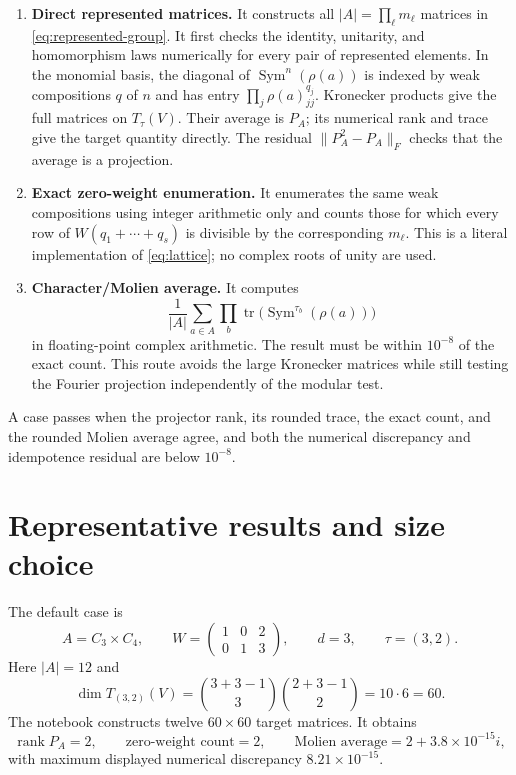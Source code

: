 \documentclass[11pt]{article}
\newcommand{\Sym}{\operatorname{Sym}}
\begin{document}
\begin{enumerate}[leftmargin=*,label=\textbf{\arabic*.}]
\item \textbf{Direct represented matrices.}
It constructs all $|A|=\prod_\ell m_\ell$ matrices in
\eqref{eq:represented-group}.  It first checks the identity, unitarity, and
homomorphism laws numerically for every pair of represented elements.  In the
monomial basis, the diagonal of
$\Sym^n(\rho(a))$ is indexed by weak compositions $q$ of $n$ and has entry
$\prod_j\rho(a)_{jj}^{q_j}$.  Kronecker products give the full matrices on
$T_\tau(V)$.  Their average is $P_A$; its numerical rank and trace give the
target quantity directly.  The residual $\lVert P_A^2-P_A\rVert_F$ checks
that the average is a projection.

\item \textbf{Exact zero-weight enumeration.}
It enumerates the same weak compositions using integer arithmetic only and
counts those for which every row of $W(q_1+\cdots+q_s)$ is divisible by the
corresponding $m_\ell$.  This is a literal implementation of
\eqref{eq:lattice}; no complex roots of unity are used.

\item \textbf{Character/Molien average.}
It computes
\[
 \frac1{|A|}\sum_{a\in A}
 \prod_b\operatorname{tr}\bigl(\Sym^{\tau_b}(\rho(a))\bigr)
\]
in floating-point complex arithmetic.  The result must be within $10^{-8}$ of
the exact count.  This route avoids the large Kronecker matrices while still
testing the Fourier projection independently of the modular test.
\end{enumerate}

A case passes when the projector rank, its rounded trace, the exact count, and
the rounded Molien average agree, and both the numerical discrepancy and
idempotence residual are below $10^{-8}$.

\section{Representative results and size choice}

The default case is
\[
 A=C_3\times C_4,\qquad
 W=\begin{pmatrix}1&0&2\\0&1&3\end{pmatrix},\qquad
 d=3,\qquad \tau=(3,2).
\]
Here $|A|=12$ and
\[
\dim T_{(3,2)}(V)=
\binom{3+3-1}{3}\binom{2+3-1}{2}=10\cdot6=60.
\]
\clearpage
\thispagestyle{fancy}
The notebook constructs twelve $60\times60$ target matrices.  It obtains
\[
 \operatorname{rank}P_A=2,\qquad
 \text{zero-weight count}=2,\qquad
 \text{Molien average}=2+3.8\times10^{-15}i,
\]
with maximum displayed numerical discrepancy $8.21\times10^{-15}$.
\end{document}
